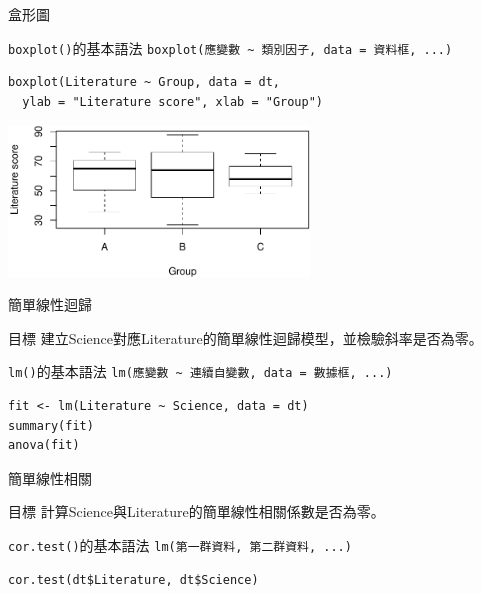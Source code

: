\documentclass[12pt, aspectratio=43]{beamer}
\begin{document}
\begin{frame}[fragile]{盒形圖}

\begin{block}{\texttt{boxplot()}的基本語法}
\verb+boxplot(應變數 ~ 類別因子, data = 資料框, ...)+
\end{block}

\begin{verbatim}
boxplot(Literature ~ Group, data = dt, 
  ylab = "Literature score", xlab = "Group")
\end{verbatim}

\begin{center}
\includegraphics[width=0.6\textwidth]{Rplot-three-group.pdf}
\end{center}
\end{frame}

%


\begin{frame}[fragile]{簡單線性迴歸}
\begin{block}{目標}
建立Science對應Literature的簡單線性迴歸模型，並檢驗斜率是否為零。
\end{block}
\begin{block}{\texttt{lm()}的基本語法}
\verb+lm(應變數 ~ 連續自變數, data = 數據框, ...)+
\end{block}
\begin{verbatim}
fit <- lm(Literature ~ Science, data = dt)
summary(fit)
anova(fit)
\end{verbatim}
\end{frame}


\begin{frame}[fragile]{簡單線性相關}
\begin{block}{目標}
計算Science與Literature的簡單線性相關係數是否為零。
\end{block}
\begin{block}{\texttt{cor.test()}的基本語法}
\verb+lm(第一群資料, 第二群資料, ...)+
\end{block}
\begin{verbatim}
cor.test(dt$Literature, dt$Science)
\end{verbatim}
\end{frame}
\end{document}
